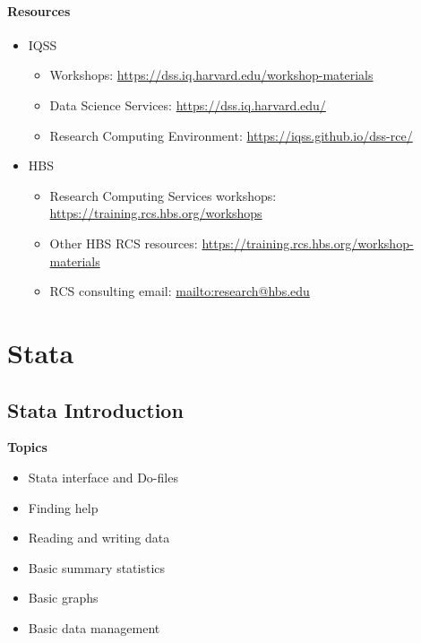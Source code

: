 \documentclass[]{book}
\providecommand{\tightlist}{%
  \setlength{\itemsep}{0pt}\setlength{\parskip}{0pt}}
\begin{document}
\hypertarget{resources-8}{%
\subsection{Resources}\label{resources-8}}

\begin{itemize}
\tightlist
\item
  IQSS

  \begin{itemize}
  \tightlist
  \item
    Workshops: \url{https://dss.iq.harvard.edu/workshop-materials}
  \item
    Data Science Services: \url{https://dss.iq.harvard.edu/}
  \item
    Research Computing Environment: \url{https://iqss.github.io/dss-rce/}
  \end{itemize}
\item
  HBS

  \begin{itemize}
  \tightlist
  \item
    Research Computing Services workshops: \url{https://training.rcs.hbs.org/workshops}
  \item
    Other HBS RCS resources: \url{https://training.rcs.hbs.org/workshop-materials}
  \item
    RCS consulting email: \url{mailto:research@hbs.edu}
  \end{itemize}
\end{itemize}

\hypertarget{part-stata}{%
\part{Stata}\label{part-stata}}

\hypertarget{stata-introduction}{%
\chapter{Stata Introduction}\label{stata-introduction}}

\textbf{Topics}

\begin{itemize}
\tightlist
\item
  Stata interface and Do-files
\item
  Finding help
\item
  Reading and writing data
\item
  Basic summary statistics
\item
  Basic graphs
\item
  Basic data management
\end{itemize}
\end{document}
